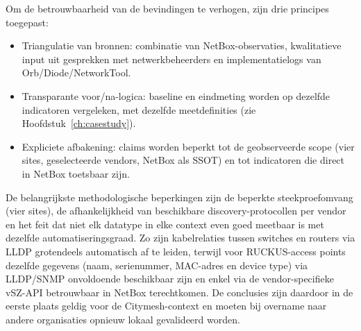 Om de betrouwbaarheid van de bevindingen te verhogen, zijn drie principes toegepast:
\begin{itemize}
  \item Triangulatie van bronnen: combinatie van NetBox-observaties, kwalitatieve input uit gesprekken met netwerkbeheerders en implementatielogs van Orb/Diode/NetworkTool.
  \item Transparante voor/na-logica: baseline en eindmeting worden op dezelfde indicatoren vergeleken, met dezelfde meetdefinities (zie Hoofdstuk~\ref{ch:casestudy}).
  \item Expliciete afbakening: claims worden beperkt tot de geobserveerde scope (vier sites, geselecteerde vendors, NetBox als SSOT) en tot indicatoren die direct in NetBox toetsbaar zijn.
\end{itemize}

De belangrijkste methodologische beperkingen zijn de beperkte steekproefomvang (vier sites), de afhankelijkheid van beschikbare discovery-protocollen per vendor en het feit dat niet elk datatype in elke context even goed meetbaar is met dezelfde automatiseringsgraad. Zo zijn kabelrelaties tussen switches en routers via LLDP grotendeels automatisch af te leiden, terwijl voor RUCKUS-access points dezelfde gegevens (naam, serienummer, MAC-adres en device type) via LLDP/SNMP onvoldoende beschikbaar zijn en enkel via de vendor-specifieke vSZ-API\autocite{RuckusVSZ} betrouwbaar in NetBox terechtkomen. De conclusies zijn daardoor in de eerste plaats geldig voor de Citymesh-context en moeten bij overname naar andere organisaties opnieuw lokaal gevalideerd worden.

